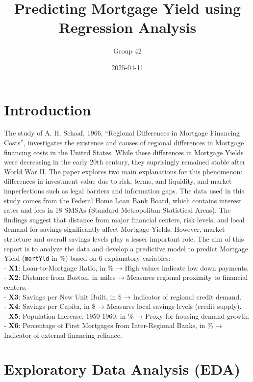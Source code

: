\documentclass[
  11pt,
]{article}
\title{\textbf{Predicting Mortgage Yield using Regression Analysis}}
\author{Group 42}
\date{2025-04-11}
\begin{document}
\maketitle

\section{Introduction}\label{introduction}

The study of A. H. Schaaf, 1966, ``Regional Differences in Mortgage
Financing Costs'', investigates the existence and causes of regional
differences in Mortgage financing costs in the United States. While
these differences in Mortgage Yields were decreasing in the early 20th
century, they suprisingly remained stable after World War II. The paper
explores two main explanations for this phenomenon: differences in
investment value due to risk, terms, and liquidity, and market
imperfections such as legal barriers and information gaps.
\vspace{0.5pt} The data used in this study comes from the Federal Home
Loan Bank Board, which contains interest rates and fees in 18 SMSAs
(Standard Metropolitan Statistical Areas). The findings suggest that
distance from major financial centers, risk levels, and local demand for
savings significantly affect Mortgage Yields. However, market structure
and overall savings levels play a lesser important role. \vspace{0.5pt}
The aim of this report is to analyze the data and develop a predictive
model to predict Mortgage Yield (\texttt{mortYld} in \%) based on 6
explanatory variables:\\
- \textbf{X1}: Loan-to-Mortgage Ratio, in \% → High values indicate low
down payments.\\
- \textbf{X2}: Distance from Boston, in miles → Measures regional
proximity to financial centers.\\
- \textbf{X3}: Savings per New Unit Built, in \$ → Indicator of regional
credit demand.\\
- \textbf{X4}: Savings per Capita, in \$ → Measures local savings levels
(credit supply).\\
- \textbf{X5}: Population Increase, 1950-1960, in \% → Proxy for housing
demand growth.\\
- \textbf{X6}: Percentage of First Mortgages from Inter-Regional Banks,
in \% → Indicator of external financing reliance.

\section{Exploratory Data Analysis
(EDA)}\label{exploratory-data-analysis-eda}
\end{document}
